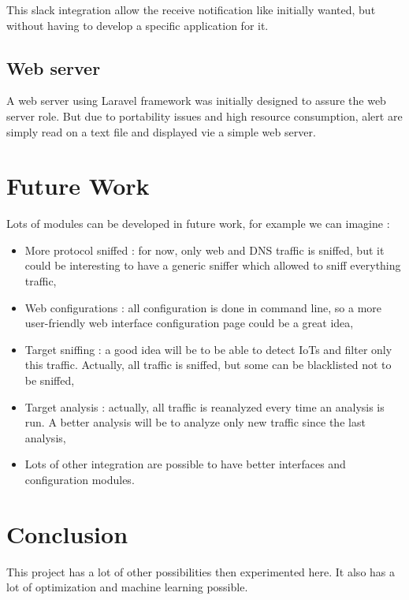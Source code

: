 \begin{frame}{}
\begin{multicols}{3}
This slack integration allow the receive notification like initially wanted, but without having to develop a specific application for it.

\subsection{Web server}
A web server using Laravel framework was initially designed to assure the web server role. But due to portability issues and high resource consumption, alert are simply read on a text file and displayed vie a simple web server.

\section{Future Work}
Lots of modules can be developed in future work, for example we can imagine : 
\begin{itemize}
	\item More protocol sniffed : for now, only web and DNS traffic is sniffed, but it could be interesting to have a generic sniffer which allowed to sniff everything traffic,
	
	\item Web configurations : all configuration is done in command line, so a more user-friendly web interface configuration page could be a great idea,
	
	\item Target sniffing : a good idea will be to be able to detect IoTs and filter only this traffic. Actually, all traffic is sniffed, but some can be blacklisted not to be sniffed,

	\item Target analysis : actually, all traffic is reanalyzed every time an analysis is run. A better analysis will be to analyze only new traffic since the last analysis,

	\item Lots of other integration are possible to have better interfaces and configuration modules.
\end{itemize}


\section{Conclusion}
This project has a lot of other possibilities then experimented here. It also has a lot of optimization and machine learning possible. 

\end{multicols}
\end{frame}












